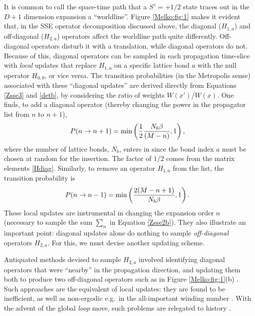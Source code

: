 \documentclass[vecphys]{svmult}
\begin{document}
It is common to call the space-time path that a $S^z=+1/2$ state traces out in the $D+1$ dimension expansion a ``worldline''.  Figure \ref{Melko:fig:1} makes it evident that, in the SSE operator decomposition discussed above, the diagonal ($H_{1,a}$) and off-diagonal ($H_{2,a}$) operators affect the worldline path quite differently.  Off-diagonal operators disturb it with a translation, while diagonal operators do not.  Because of this, diagonal operators can be sampled in each propagation time-slice with {\em local} updates that replace $H_{1,a}$ on a specific lattice bond $a$ with the null operator $H_{0,0}$, or vice versa.  The transition probabilities (in the Metropolis sense) associated with these ``diagonal updates'' are derived directly from Equations \ref{Zsse3} and \ref{detb}, by considering the ratio of weights $W(x')/W(x)$.  One finds,
to add a diagonal operator (thereby changing the power in the propagator list from $n$ to $n+1$),
\begin{eqnarray}
P(n \rightarrow n+1) = {\rm min} \left({ \frac{1}{2}\frac{N_b \beta}{(M-n)}, 1 }\right),
\end{eqnarray}
where the number of lattice bonds, $N_b$, enters in since the bond index $a$ must be chosen at random for the insertion.  The factor of $1/2$ comes from the matrix elements \ref{Hdiag}.  Similarly, to remove an operator $H_{1,a}$ from the list, the transition probability is
\begin{eqnarray}
P(n \rightarrow n-1) = {\rm min} \left({ \frac{2(M-n+1)}{N_b \beta}, 1 }\right).
\end{eqnarray}
These local updates are instrumental in changing the expansion order $n$ (necessary to sample the sum $\sum_n$ in Equation \ref{Zsse2b}).  They also illustrate an important point: diagonal updates alone do nothing to sample {\em off-diagonal} operators $H_{2,a}$.  For this, we must devise another updating scheme.

Antiquated methods devised to sample $H_{2,a}$ involved identifying diagonal operators that were ``nearby'' in the propagation direction, and updating them both to produce two off-diagonal operators such as in Figure \ref{Melko:fig:1}(b) \cite{Melko:SandvikHeis}.  Such approaches are the equivalent of local updates: they are found to be inefficient, as well as non-ergodic e.g.~in the all-important winding number \cite{Melko:PC}.  With the advent of the global {\it loop} move, such problems are relegated to history \cite{Melko:Sandvik99,Melko:Syljuasen02}.  
\end{document}
